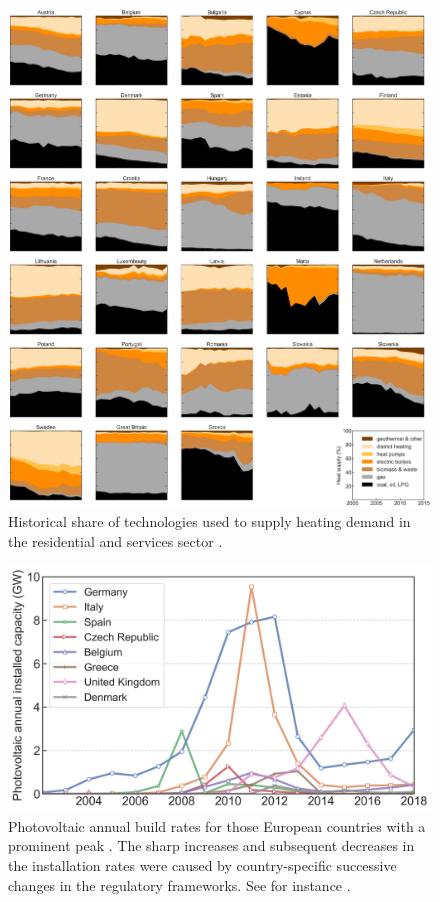 \documentclass[3p]{elsarticle} %
\begin{document}
\begin{figure}[!h]
\centering
\includegraphics[width=\textwidth]{../figures/heating_historical.png}
\caption{Historical share of technologies used to supply heating demand in the residential and services sector \cite{IDEES}. } \label{fig_historical_heating} 
\end{figure}
\clearpage


\begin{figure}[!h]
\centering
\includegraphics[width=12cm]{../figures/installation_rates_PV.png}
\caption{Photovoltaic annual build rates for those European countries with a prominent peak \cite{IRENA_2019}. The sharp increases and subsequent decreases in the installation rates were caused by country-specific successive changes in the regulatory frameworks. See for instance \cite{Report_Fraunhofer_2019, Victoria_2012}. } \label{fig_installation_rates_PV} 
\end{figure}
\clearpage
\end{document}
